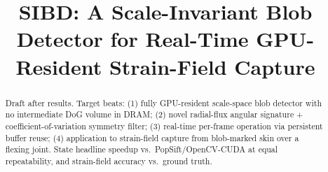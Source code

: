 \documentclass[sigconf,nonacm]{acmart}
\begin{document}
\title{SIBD: A Scale-Invariant Blob Detector for
Real-Time GPU-Resident Strain-Field Capture}

\author{}

\renewcommand{\shortauthors}{\note{Short authors}}

\begin{abstract}
\begin{fillbox}
Draft after results. Target beats: (1) fully GPU-resident scale-space blob
detector with no intermediate DoG volume in DRAM; (2) novel radial-flux
angular signature + coefficient-of-variation symmetry filter; (3) real-time
per-frame operation via persistent buffer reuse; (4) application to strain-field
capture from blob-marked skin over a flexing joint. State headline
speedup vs.\ PopSift/OpenCV-CUDA at equal repeatability, and strain-field
accuracy vs.\ ground truth.
\end{fillbox}
\end{abstract}


\maketitle


\end{document}
